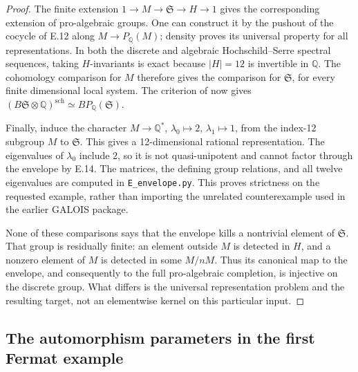 \begin{proof}
The finite extension \(1\to M\to\mathfrak S\to H\to1\)
gives the corresponding extension of pro-algebraic groups.
One can construct it by the pushout of the cocycle of E.12
along \(M\to P_{\mathbb Q}(M)\); density proves its universal
property for all representations.  In both the discrete and
algebraic Hochschild--Serre spectral sequences, taking
\(H\)-invariants is exact because \(|H|=12\) is invertible in
\(\mathbb Q\).  The cohomology comparison for \(M\) therefore
gives the comparison for \(\mathfrak S\), for every finite
dimensional local system.  The criterion of
\citet[Lemma~3.3.2 and Definition~3.4.1]{E_Toen2006} now gives
\((B\mathfrak S\otimes\mathbb Q)^{\mathrm{sch}}
 \simeq BP_{\mathbb Q}(\mathfrak S)\).

Finally, induce the character
\(M\to\mathbb Q^*\), \(\lambda_0\mapsto2\),
\(\lambda_1\mapsto1\), from the index-12 subgroup \(M\)
to \(\mathfrak S\).  This gives a 12-dimensional rational
representation.  The eigenvalues of \(\lambda_0\) include 2,
so it is not quasi-unipotent and cannot factor through the
envelope by E.14.  The matrices, the defining group relations,
and all twelve eigenvalues are computed in
\texttt{E\_envelope.py}.  This proves strictness on the
requested example, rather than importing the unrelated
counterexample used in the earlier GALOIS package.

None of these comparisons says that the envelope kills a
nontrivial element of \(\mathfrak S\).  That group is residually
finite: an element outside \(M\) is detected in \(H\), and a
nonzero element of \(M\) is detected in some \(M/nM\).
Thus its canonical map to the envelope, and consequently to
the full pro-algebraic completion, is injective on the
discrete group.  What differs is the universal representation
problem and the resulting target, not an elementwise kernel
on this particular input.
\end{proof}

\subsection{The automorphism parameters in the first Fermat example}

